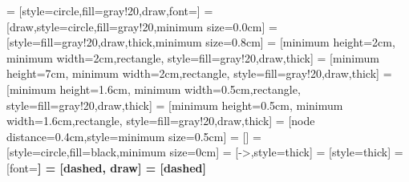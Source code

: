 
 =
[style={circle,fill=gray!20,draw,font=\sffamily\large\bfseries}]
 = [draw,style={circle,fill=gray!20},minimum size=0.0cm]
 = [style={fill=gray!20,draw,thick,minimum size=0.8cm}]
 = [minimum height=2cm, minimum width=2cm,rectangle,
					style={fill=gray!20,draw,thick}]
 = [minimum height=7cm, minimum width=2cm,rectangle,
					style={fill=gray!20,draw,thick}]
 = [minimum height=1.6cm, minimum width=0.5cm,rectangle,
	               style={fill=gray!20,draw,thick}]
 = [minimum height=0.5cm, minimum width=1.6cm,rectangle,
	               style={fill=gray!20,draw,thick}]
 = [node distance=0.4cm,style={minimum size=0.5cm}]
 = []
 = [style={circle,fill=black,minimum size=0cm}]
 = [->,style={thick}]
 = [style={thick}]
 = [font=\sffamily\small\bfseries]
 = [dashed, draw]
 = [dashed]

